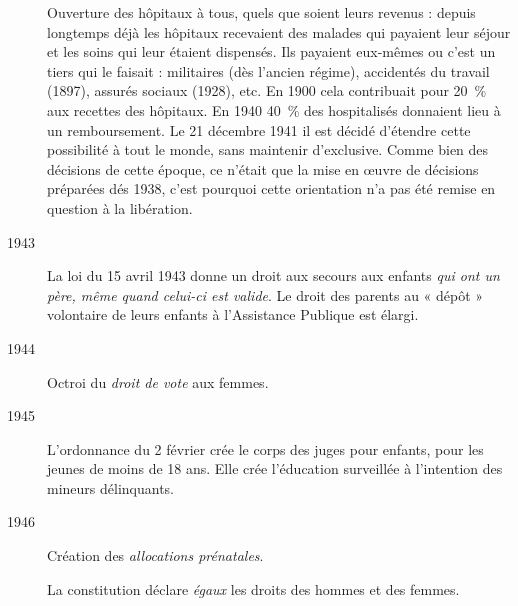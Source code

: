 \begin{description}
Ouverture des hôpitaux à tous, quels que soient leurs revenus : depuis longtemps déjà les hôpitaux recevaient des malades qui payaient leur séjour et les soins qui leur étaient dispensés. Ils payaient eux-mêmes ou c'est un tiers qui le faisait : militaires (dès l'ancien régime), accidentés du travail (1897), assurés sociaux (1928), etc. En 1900 cela contribuait pour 20~\% aux recettes des hôpitaux. En 1940 40~\% des hospitalisés donnaient lieu à un remboursement. Le 21 décembre 1941 il est décidé d'étendre cette possibilité à tout le monde, sans maintenir d'exclusive. Comme bien des décisions de cette époque, ce n'était que la mise en œuvre de décisions préparées dés 1938, c'est pourquoi cette orientation n'a pas été remise en question à la libération.

\item[1943] La loi du 15 avril 1943 donne un droit aux secours aux enfants \emph{qui ont un père, même quand celui-ci est valide}. Le droit des parents au « dépôt » volontaire de leurs enfants à l'Assistance Publique est élargi.

\item[1944] Octroi du \emph{droit de vote} aux femmes. 

\item[1945] L'ordonnance du 2 février crée le corps des juges pour enfants, pour les jeunes de moins de 18 ans. Elle crée l'éducation surveillée à l'intention des mineurs délinquants.

\item[1946] Création des \emph{allocations prénatales}.

La constitution déclare \emph{égaux} les droits des hommes et des femmes.
\end{description}


